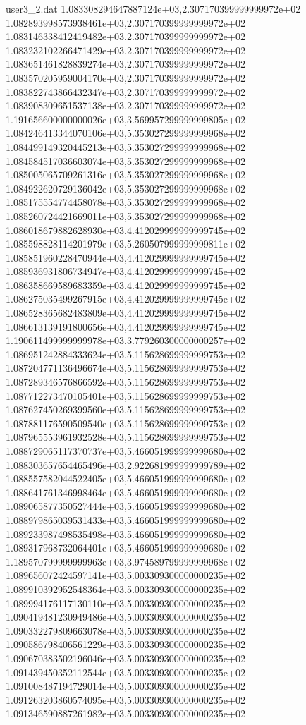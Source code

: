 \begin{filecontents}{user3_2.dat}
1.083308294647887124e+03,2.307170399999999972e+02
1.082893998573938461e+03,2.307170399999999972e+02
1.083146338412419482e+03,2.307170399999999972e+02
1.083232102266471429e+03,2.307170399999999972e+02
1.083651461828839274e+03,2.307170399999999972e+02
1.083570205959004170e+03,2.307170399999999972e+02
1.083822743866432347e+03,2.307170399999999972e+02
1.083908309651537138e+03,2.307170399999999972e+02
1.191656600000000026e+03,3.569957299999999805e+02
1.084246413344070106e+03,5.353027299999999968e+02
1.084499149320445213e+03,5.353027299999999968e+02
1.084584517036603074e+03,5.353027299999999968e+02
1.085005065709261316e+03,5.353027299999999968e+02
1.084922620729136042e+03,5.353027299999999968e+02
1.085175554774458078e+03,5.353027299999999968e+02
1.085260724421669011e+03,5.353027299999999968e+02
1.086018679882628930e+03,4.412029999999999745e+02
1.085598828114201979e+03,5.260507999999999811e+02
1.085851960228470944e+03,4.412029999999999745e+02
1.085936931806734947e+03,4.412029999999999745e+02
1.086358669589683359e+03,4.412029999999999745e+02
1.086275035499267915e+03,4.412029999999999745e+02
1.086528365682483809e+03,4.412029999999999745e+02
1.086613139191800656e+03,4.412029999999999745e+02
1.190611499999999978e+03,3.779260300000000257e+02
1.086951242884333624e+03,5.115628699999999753e+02
1.087204771136496674e+03,5.115628699999999753e+02
1.087289346576866592e+03,5.115628699999999753e+02
1.087712273470105401e+03,5.115628699999999753e+02
1.087627450269399560e+03,5.115628699999999753e+02
1.087881176590509540e+03,5.115628699999999753e+02
1.087965553961932528e+03,5.115628699999999753e+02
1.088729065117370737e+03,5.466051999999999680e+02
1.088303657654465496e+03,2.922681999999999789e+02
1.088557582044522405e+03,5.466051999999999680e+02
1.088641761346998464e+03,5.466051999999999680e+02
1.089065877350527444e+03,5.466051999999999680e+02
1.088979865039531433e+03,5.466051999999999680e+02
1.089233987498535498e+03,5.466051999999999680e+02
1.089317968732064401e+03,5.466051999999999680e+02
1.189570799999999963e+03,3.974589799999999968e+02
1.089656072424597141e+03,5.003309300000000235e+02
1.089910392952548364e+03,5.003309300000000235e+02
1.089994176117130110e+03,5.003309300000000235e+02
1.090419481230949486e+03,5.003309300000000235e+02
1.090332279809663078e+03,5.003309300000000235e+02
1.090586798406561229e+03,5.003309300000000235e+02
1.090670383502196046e+03,5.003309300000000235e+02
1.091439450352112544e+03,5.003309300000000235e+02
1.091008487194729014e+03,5.003309300000000235e+02
1.091263203860574095e+03,5.003309300000000235e+02
1.091346590887261982e+03,5.003309300000000235e+02

\end{filecontents}
